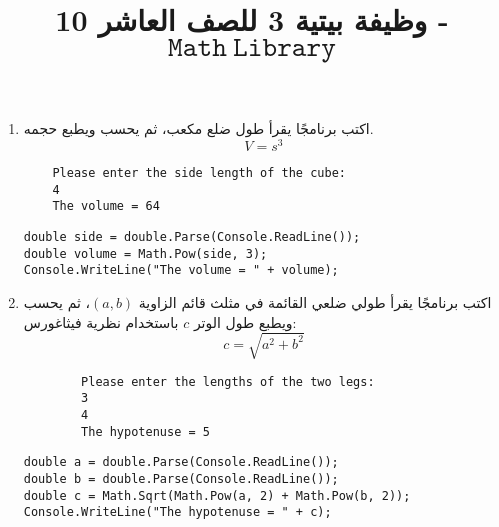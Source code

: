 \documentclass[12pt]{article}
\title{وظيفة بيتية 3 للصف العاشر 10 - $\mathtt{Math\ Library}$}
\begin{document}
\maketitle
\thispagestyle{fancy}

\begin{enumerate}[itemsep=3em]
    \item
    اكتب برنامجًا يقرأ طول ضلع مكعب، ثم يحسب ويطبع حجمه.
    \[
    V = s^3
    \]
    \ifdetailed
    \begin{example}
    \begin{english}
    \begin{lstlisting}
    Please enter the side length of the cube:
    4
    The volume = 64
    \end{lstlisting}
    \end{english}
    \end{example}
    \ifwithsols
    \begin{solution}
    \begin{english}
    \begin{lstlisting}
double side = double.Parse(Console.ReadLine());
double volume = Math.Pow(side, 3);
Console.WriteLine("The volume = " + volume);
    \end{lstlisting}
    \end{english}
    \end{solution}
    \clearpage
    \fi
    \fi

    \item
    اكتب برنامجًا يقرأ طولي ضلعي القائمة في مثلث قائم الزاوية $(a, b)$، ثم يحسب ويطبع طول الوتر $c$ باستخدام نظرية فيثاغورس:
    \[
        c = \sqrt{a^2 + b^2}
    \]
    \ifdetailed
    \begin{example}
        \begin{english}
    \begin{lstlisting}
        Please enter the lengths of the two legs:
        3
        4
        The hypotenuse = 5
    \end{lstlisting}
\end{english}
\end{example}
\ifwithsols
\begin{solution}
    \begin{english}
        \begin{lstlisting}
double a = double.Parse(Console.ReadLine());
double b = double.Parse(Console.ReadLine());
double c = Math.Sqrt(Math.Pow(a, 2) + Math.Pow(b, 2));
Console.WriteLine("The hypotenuse = " + c);
        \end{lstlisting}
    \end{english}
\end{solution}
\fi
\clearpage
\fi



\end{enumerate}
\end{document}
